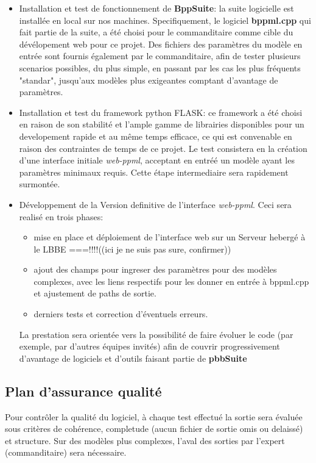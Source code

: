 \begin{itemize}
	\item Installation et test de fonctionnement de \textbf{BppSuite}: la suite logicielle est installée en local sur nos machines. Specifiquement, le logiciel \textbf{bppml.cpp} qui fait partie de la suite, a été choisi pour le commanditaire comme cible du dévélopement web pour ce projet. Des fichiers des paramètres du modèle en entrée sont fournis également par le commanditaire, afin de tester plusieurs scenarios possibles, du plus simple, en passant par les cas les plus fréquents "standar", jusqu'aux modèles plus exigeantes comptant d'avantage de paramètres.
	
	\item Installation et test du framework python FLASK: ce framework a été choisi 
	en raison de son stabilité et l'ample gamme de librairies disponibles pour un developement rapide et au même temps efficace, ce qui est convenable en raison des contraintes de temps de ce projet.
	Le test consistera en la création d'une interface initiale \textit{web-ppml}, acceptant en entréé un modèle ayant les paramètres minimaux requis. Cette étape intermediaire sera rapidement surmontée.
	
	\item Développement de la Version definitive de l'interface \textit{web-ppml}. Ceci sera realisé en trois phases:
	
	\begin{itemize}
		\item mise en place et déploiement de l'interface web sur un Serveur hebergé à le LBBE ===!!!!((ici je ne suis pas sure, confirmer))
		\item ajout des champs pour ingreser des paramètres pour des modèles complexes, avec les liens respectifs pour les donner en entrée à bppml.cpp et ajustement de paths de sortie.
		\item derniers tests et correction d'éventuels erreurs.
	\end{itemize}
	
	La prestation sera orientée vers la possibilité de faire évoluer le code (par exemple, par d'autres équipes invités) afin de couvrir progressivement d'avantage de logiciels et d'outils faisant partie de \textbf{pbbSuite}
\end{itemize}


\subsection{ Plan d'assurance qualité }
 Pour contrôler la qualité du logiciel, à chaque test effectué la sortie sera  évaluée sous critères de cohérence, completude (aucun fichier de sortie omis ou delaissé) et structure. Sur des modèles plus complexes, l'aval des sorties par l'expert (commanditaire) sera nécessaire.
 
